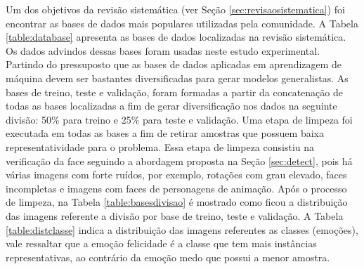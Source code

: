 Um dos objetivos da revisão sistemática (ver Seção \ref{sec:revisaosistematica}) foi encontrar as bases de dados mais populares utilizadas pela comunidade. A Tabela \ref{table:database} apresenta as bases de dados localizadas na revisão sistemática. Os dados advindos dessas bases foram usadas neste estudo experimental. Partindo do pressuposto que as bases de dados aplicadas em aprendizagem de máquina devem ser bastantes diversificadas para gerar modelos generalistas. As bases de treino, teste e validação, foram formadas a partir da concatenação de todas as bases localizadas a fim de gerar diversificação nos dados na seguinte divisão: 50\% para treino e 25\% para teste e validação. Uma etapa de limpeza foi executada em todas as bases a fim de retirar amostras que possuem baixa representatividade para o problema. Essa etapa de limpeza consistiu na verificação da face seguindo a abordagem proposta na Seção \ref{sec:detect}, pois há várias imagens com forte ruídos, por exemplo, rotações com grau elevado, faces incompletas e imagens com faces de personagens de animação. Após o processo de limpeza, na Tabela \ref{table:basesdivisao} é mostrado como ficou a distribuição das imagens referente a divisão por base de treino, teste e validação. A Tabela \ref{table:distclasse} indica a distribuição das imagens referentes as classes (emoções), vale ressaltar que a emoção felicidade é a classe que tem mais instâncias representativas, ao contrário da emoção medo que possui a menor amostra.


